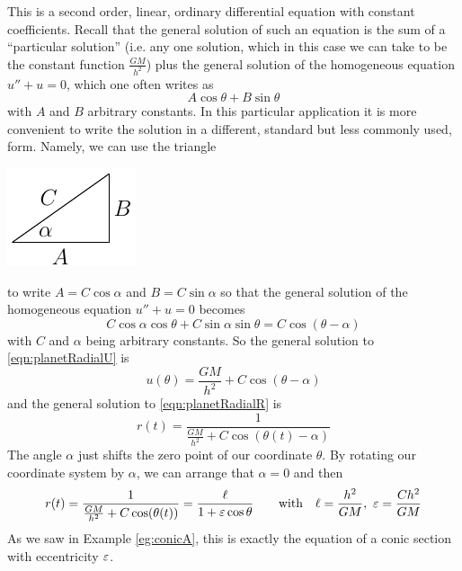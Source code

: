 This is a second order, linear, ordinary differential equation
with constant coefficients.  Recall that the general solution of such an 
equation is the sum of a ``particular solution'' (i.e. any one solution,
which in this case we can take to be the constant function $\frac{GM}{h^2}$)
plus the general solution of the homogeneous equation
$u''+u=0$, which one often writes as
\begin{equation*}
A\cos\theta +B\sin\theta
\end{equation*}
with $A$ and $B$  arbitrary constants. In this particular application it is 
more convenient to write the solution in a different, standard but less
commonly used, form. Namely, we can use the triangle
\begin{efig}
\begin{center}
     \includegraphics{trianglePl.pdf}
\end{center}
\end{efig}
to write $A= C\cos\alpha$ and $B=C\sin\alpha$ so that 
the general solution of the homogeneous equation $u''+u=0$ becomes
\begin{equation*}
C\cos\alpha\cos\theta +C\sin\alpha\sin\theta
=C\cos(\theta-\alpha)
\end{equation*}
with $C$ and $\alpha$ being arbitrary constants. So the general solution 
to \eqref{eqn:planetRadialU} is
\begin{equation*}
u(\theta) = \frac{GM}{h^2} + C\cos(\theta-\alpha)
\end{equation*}
and the general solution to \eqref{eqn:planetRadialR} is
\begin{equation*}
r(t) = \frac{1}{\frac{GM}{h^2} + C\cos(\theta(t)-\alpha)}
\end{equation*}
The angle $\alpha$ just shifts the zero point of our coordinate $\theta$.
By rotating our coordinate system by $\alpha$, we can arrange that $\alpha=0$
and then
\begin{equation*}
r(t) = \frac{1}{\frac{GM}{h^2} + C\cos(\theta(t))}
     = \frac{\ell}{1+\veps\cos\theta}
\qquad\text{with}\quad
\ell=\frac{h^2}{GM},\ 
\veps=\frac{Ch^2}{GM}
\end{equation*}
As we saw in Example \ref{eg:conicA}, this is exactly the equation 
of a conic section with eccentricity $\varepsilon$.

